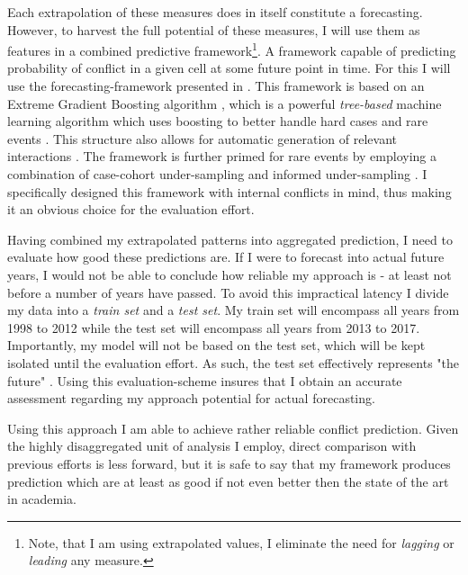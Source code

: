 \documentclass[a4paper]{article}
\begin{document}
Each extrapolation of these measures does in itself constitute a forecasting. However, to harvest the full potential of these measures, I will use them as features in a combined predictive framework\footnote{Note, that I am using extrapolated values, I eliminate the need for \emph{lagging} or \emph{leading} any measure.}. A framework capable of predicting probability of conflict in a given cell at some future point in time. For this I will use the forecasting-framework presented in \cite{Maase}. This framework is based on an Extreme Gradient Boosting algorithm \citep{Chen_2016}, which is a powerful \emph{tree-based} machine learning algorithm which uses boosting to better handle hard cases and rare events \citep[337-341]{Friedman_2001}. This structure also allows for automatic generation of relevant interactions \citep[305-310]{Friedman_2001}. The framework is further primed for rare events by employing a combination of case-cohort under-sampling \citep[142]{King_Zeng_2001} and informed under-sampling \cite[1267]{He_2008}. I specifically designed this framework with internal conflicts in mind, thus making it an obvious choice for the evaluation effort.\par 




Having combined my extrapolated patterns into aggregated prediction, I need to evaluate how good these predictions are. If I were to forecast into actual future years, I would not be able to conclude how reliable my approach is - at least not before a number of years have passed. To avoid this impractical latency I divide my data into a \emph{train set} and a \emph{test set}. My train set will encompass all years from 1998 to 2012 while the test set will encompass all years from 2013 to 2017. Importantly, my model will not be based on the test set, which will be kept isolated until the evaluation effort. As such, the test set effectively represents "the future" \cite[199-200]{Goldstone_2010}. Using this evaluation-scheme insures that I obtain an accurate assessment regarding my approach potential for actual forecasting.\par 

Using this approach I am able to achieve rather reliable conflict prediction. Given the highly disaggregated unit of analysis I employ, direct comparison with previous efforts is less forward, but it is safe to say that my framework produces prediction which are at least as good if not even better then the state of the art in academia.\par %
\end{document}
